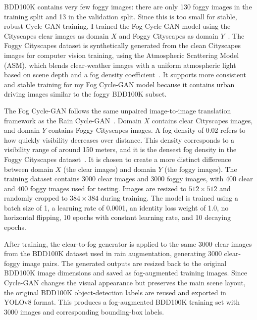 \documentclass[10pt,letterpaper]{article}
\begin{document}
BDD100K contains very few foggy images: there are only 130 foggy images in the training split and 13 in the validation split. Since this is too small for stable, robust Cycle-GAN training,
I trained the Fog Cycle-GAN model using the Cityscapes clear images as domain $X$ and Foggy Cityscapes as domain $Y$~\cite{cordtsCityscapesDatasetSemantic2016,sakaridisSemanticFoggyScene2018}. 
The Foggy Cityscapes dataset is synthetically generated from the clean Cityscapes images for computer vision training, using the Atmospheric Scattering Model (ASM), which blends clear-weather 
images with a uniform atmospheric light based on scene depth and a fog density coefficient~\cite{cordtsCityscapesDatasetSemantic2016}. 
It supports more consistent and stable training for my Fog Cycle-GAN model because it contains urban driving images similar to the foggy BDD100K subset.

The Fog Cycle-GAN follows the same unpaired image-to-image translation framework as the Rain Cycle-GAN~\cite{zhuUnpairedImagetoImageTranslation2020}. 
Domain $X$ contains clear Cityscapes images, and domain $Y$ contains Foggy Cityscapes images. A fog density of 0.02 refers to how quickly visibility decreases over distance. 
This density corresponds to a visibility range of around 150 meters, and it is the densest fog density in the Foggy Cityscapes dataset~\cite{cordtsCityscapesDatasetSemantic2016}. It is chosen to create a more distinct difference between 
domain $X$ (the clear images) and domain $Y$ (the foggy images). The training dataset contains 3000 clear images 
and 3000 foggy images, with 400 clear and 400 foggy images used for testing. Images are resized to $512\times512$ and randomly cropped to $384\times384$ 
during training. The model is trained using a batch size of 1, a learning rate of 0.0001, an identity loss weight of 1.0, no horizontal flipping, 10 epochs 
with constant learning rate, and 10 decaying epochs.

After training, the clear-to-fog generator is applied to the same 3000 clear images from the BDD100K dataset used in rain augmentation, generating 3000 clear-foggy image pairs.
The generated outputs are resized back to the original BDD100K image dimensions and saved as fog-augmented training images. Since Cycle-GAN changes the visual appearance but preserves 
the main scene layout, the original BDD100K object-detection labels are reused and exported in YOLOv8 format. This produces a fog-augmented BDD100K training set with 3000 images and 
corresponding bounding-box labels.
\end{document}
